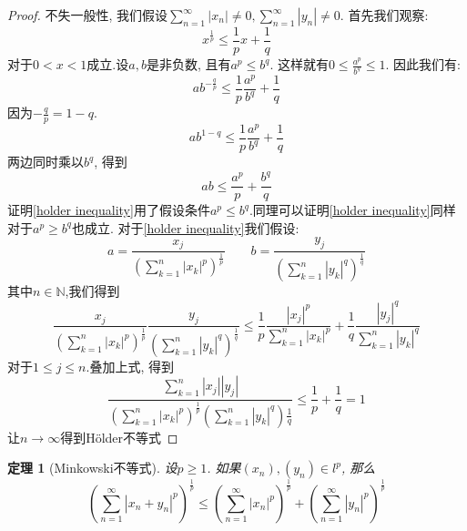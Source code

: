 \documentclass[a4paper,11pt]{article}
\newtheorem{theorem}{\hspace{2em}定理}[section]
\newtheorem{proof}{证明}[section]
\begin{document}
\begin{proof}
  不失一般性, 我们假设$\sum_{n=1}^{\infty}|x_n|\neq0,\sum_{n=1}^{\infty}|y_n|\neq0$. 首先我们观察:
  \begin{equation*}
    x^{\frac{1}{p}}\leq\frac{1}{p}x+\frac{1}{q}
  \end{equation*}
  对于$0<x<1$成立.设$a,b$是非负数, 且有$a^p\leq b^q$. 这样就有$0\leq\frac{a^p}{b^q}\leq1$. 因此我们有:
  \begin{equation*}
    ab^{-\frac{q}{p}}\leq\frac{1}{p}\frac{a^p}{b^q}+\frac{1}{q}
  \end{equation*}
  因为$-\frac{q}{p}=1-q$.
  \begin{equation*}
    ab^{1-q}\leq\frac{1}{p}\frac{a^p}{b^q}+\frac{1}{q}
  \end{equation*}
  两边同时乘以$b^q$, 得到
  \begin{equation}\label{holder inequality}
    ab\leq\frac{a^p}{p}+\frac{b^q}{q}
  \end{equation}
  证明\ref{holder inequality}用了假设条件$a^p\leq b^q$.同理可以证明\ref{holder inequality}同样对于$a^p\geq b^q$也成立. 对于\ref{holder inequality}我们假设:
  \begin{equation*}
    a=\frac{x_j}{(\sum_{k=1}^{n}|x_k|^p)^\frac{1}{p}}\quad\quad  b=\frac{y_j}{(\sum_{k=1}^{n}|y_k|^q)^\frac{1}{q}}
  \end{equation*}
  其中$n\in\mathbb{N}$,我们得到
  \begin{equation*}
    \frac{x_j}{(\sum_{k=1}^{n}|x_k|^p)^{\frac{1}{p}}}\frac{y_j}{(\sum_{k=1}^{n}|y_k|^q)^\frac{1}{q}}\leq\frac{1}{p}\frac{|x_j|^p}{\sum_{k=1}^{n}|x_k|^p}+\frac{1}{q}\frac{|y_j|^q}{\sum_{k=1}^{n}|y_k|^q}
  \end{equation*}
  对于$1\leq j\leq n$.叠加上式, 得到
  \begin{equation*}
    \frac{\sum_{k=1}^{n}|x_j||y_j|}{(\sum_{k=1}^{n}|x_k|^p)^{\frac{1}{p}}(\sum_{k=1}^{n}|y_k|^q)\frac{1}{q}}\leq\frac{1}{p}+\frac{1}{q}=1
  \end{equation*}
  让$n\rightarrow\infty$得到H\"{o}lder不等式
\end{proof}
\begin{theorem}[Minkowski不等式]
  设$p\geq1$. 如果$(x_n),(y_n)\in l^p$, 那么
  \begin{equation*}
    (\sum_{n=1}^{\infty}|x_n+y_n|^p)^{\frac{1}{p}}\leq(\sum_{n=1}^{\infty}|x_n|^p)^\frac{1}{p}+(\sum_{n=1}^{\infty}|y_n|^p)^\frac{1}{p}
  \end{equation*}
\end{theorem}
\end{document}
